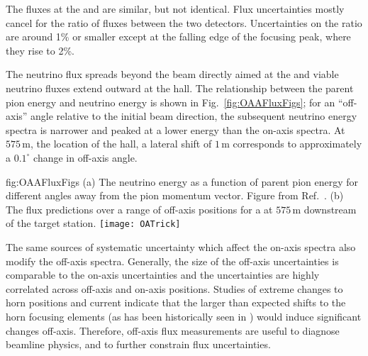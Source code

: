 The fluxes at the  and  are similar, but not identical.  Flux uncertainties mostly cancel for the ratio of fluxes between the two detectors.  Uncertainties on the ratio are around 1\% or smaller except at the falling edge of the focusing peak, where they rise to 2\%.    

The neutrino flux spreads beyond the beam directly aimed at the   and viable neutrino fluxes extend outward at the  hall. The relationship between the parent pion energy and neutrino energy is shown in Fig.~\ref{fig:OAAFluxFigs}; for an ``off-axis'' angle relative to the initial beam direction, the subsequent neutrino energy spectra is narrower and peaked at a lower energy than the on-axis spectra. At $575\,\textrm{m}$, the location of the  hall, a lateral shift of $1\,\textrm{m}$ corresponds to approximately a $0.1^\circ$ change in off-axis angle.

\begin{dunefigure}{fig:OAAFluxFigs}
{(a) The neutrino energy as a function of parent pion energy for different angles away from the pion momentum vector. Figure from Ref.~\cite{Duffy:2016owt}. (b) The   flux predictions over a range of off-axis positions for a  at $575\,\textrm{m}$ downstream of the target station. }
    \texttt{[image: OATrick]}
\end{dunefigure}

The same sources of systematic uncertainty which affect the on-axis spectra also modify the off-axis spectra.  Generally, the size of the off-axis uncertainties is comparable to the on-axis uncertainties and the uncertainties are highly correlated across off-axis and on-axis positions. Studies of extreme changes to horn positions and current indicate that the larger than expected shifts to the horn focusing elements (as has been historically seen in ) would induce significant changes off-axis. Therefore, off-axis flux measurements are useful to diagnose beamline physics, and to further constrain flux uncertainties.
